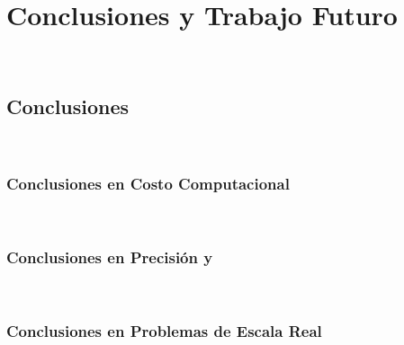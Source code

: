 %






\chapter{Conclusiones y Trabajo Futuro}~\hypertarget{ch:chapter_11}{}
\label{ch:chapter_11}

 \lipsum[1-2]


\section{Conclusiones}~\hypertarget{sec:sec1110}{}
\label{sec:sec1110}



\subsection{Conclusiones en Costo Computacional}~\hypertarget{sec:sec1111}{}
\label{sec:sec1111}



\subsection{Conclusiones en Precisión y }~\hypertarget{sec:sec1112}{}
\label{sec:sec1112}


\subsection{Conclusiones en Problemas de Escala Real}~\hypertarget{sec:sec1113}{}
\label{sec:sec1113}



